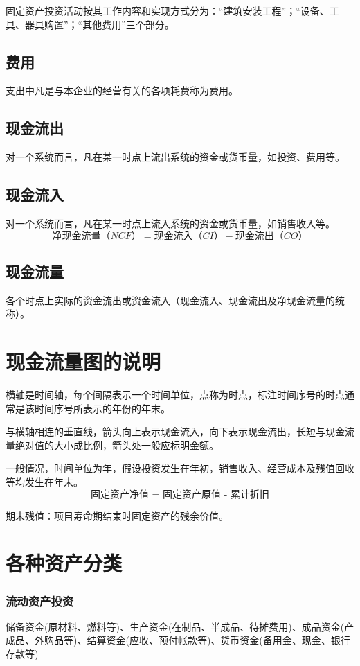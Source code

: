 \documentclass[12pt, a4paper, oneside]{ctexbook}
\begin{document}
固定资产投资活动按其工作内容和实现方式分为：“建筑安装工程”；“设备、工具、器具购置”；“其他费用”三个部分。

\subsection{费用}
支出中凡是与本企业的经营有关的各项耗费称为费用。

\subsection{现金流出}
对一个系统而言，凡在某一时点上流出系统的资金或货币量，如投资、费用等。

\subsection{现金流入}
对一个系统而言，凡在某一时点上流入系统的资金或货币量，如销售收入等。
$$
\mbox{净现金流量（}NCF\mbox{）}=\mbox{现金流入（}CI\mbox{）}-\mbox{现金流出（}CO\mbox{）}
$$

\subsection{现金流量}
各个时点上实际的资金流出或资金流入（现金流入、现金流出及净现金流量的统称）。

\section{现金流量图的说明}
横轴是时间轴，每个间隔表示一个时间单位，点称为时点，标注时间序号的时点通常是该时间序号所表示的年份的年末。

与横轴相连的垂直线，箭头向上表示现金流入，向下表示现金流出，长短与现金流量绝对值的大小成比例，箭头处一般应标明金额。

一般情况，时间单位为年，假设投资发生在年初，销售收入、经营成本及残值回收等均发生在年末。
$$
\mbox{固定资产净值 = 固定资产原值 - 累计折旧}
$$

期末残值：项目寿命期结束时固定资产的残余价值。

\section{各种资产分类}
\subsubsection{流动资产投资}
储备资金(原材料、燃料等)、生产资金(在制品、半成品、待摊费用)、成品资金(产成品、外购品等)、结算资金(应收、预付帐款等)、货币资金(备用金、现金、银行存款等)
\end{document}
